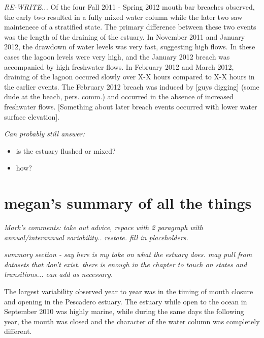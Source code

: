 \emph{RE-WRITE...} Of the four Fall 2011 - Spring 2012 mouth bar breaches observed, the early two resulted in a fully mixed water column while the later two saw maintenece of a stratified state. The primary difference between these two events was the length of the draining of the estuary. In November 2011 and January 2012, the drawdown of water levels was very fast, suggesting high flows. In these cases the lagoon levels were very high, and the January 2012 breach was accompanied by high freshwater flows. In February 2012 and March 2012, draining of the lagoon occured slowly over X-X hours compared to X-X hours in the earlier events. The February 2012 breach was induced by [guys digging] (some dude at the beach, pers. comm.) and occurred in the absence of increased freshwater flows. [Something about later breach events occurred with lower water surface elevation].

\emph{Can probably still answer:}
\begin{itemize} 
	\item is the estuary flushed or mixed?
	\item how?
\end{itemize}

	










\section{megan's summary of all the things} \label{backofch2}

\emph{Mark's comments: take out advice, repace with 2 paragraph with annual/interannual variability.. restate. fill in placeholders. }

\emph{summary section - say here is my take on what the estuary does.  may pull from datasets that don't exist.  there is enough in the chapter to touch on states and transitions... can add as necessary.}

The largest variability observed year to year was in the timing of mouth closure and opening in the Pescadero estuary. The estuary while open to the ocean in September 2010 was highly marine, while during the same days the following year, the mouth was closed and the character of the water column was completely different. 

